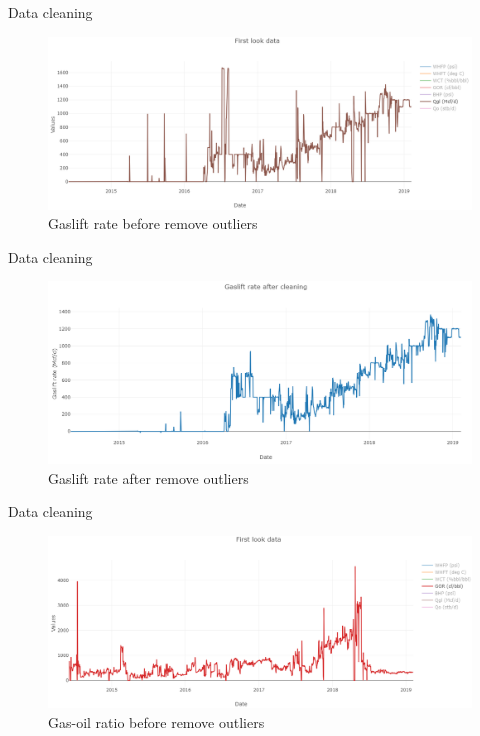 \documentclass[xcolor=table, 11pt]{beamer}
\begin{document}
\begin{frame}{Data cleaning}
    \begin{figure}
        \centering
        \includegraphics[scale=0.38]{fig/gl_before.PNG}
        \caption{Gaslift rate before remove outliers}
        \label{fig:gl_before}
    \end{figure}
\end{frame}
\begin{frame}{Data cleaning}
    \begin{figure}
        \centering
        \includegraphics[scale=0.38]{fig/gl_after.PNG}
        \caption{Gaslift rate after remove outliers}
        \label{fig:gl_after}
    \end{figure}
\end{frame}
\begin{frame}{Data cleaning}
    \begin{figure}
        \centering
        \includegraphics[scale=0.38]{fig/gor_before.PNG}
        \caption{Gas-oil ratio before remove outliers}
        \label{fig:gor_before}
    \end{figure}
\end{frame}
\end{document}
